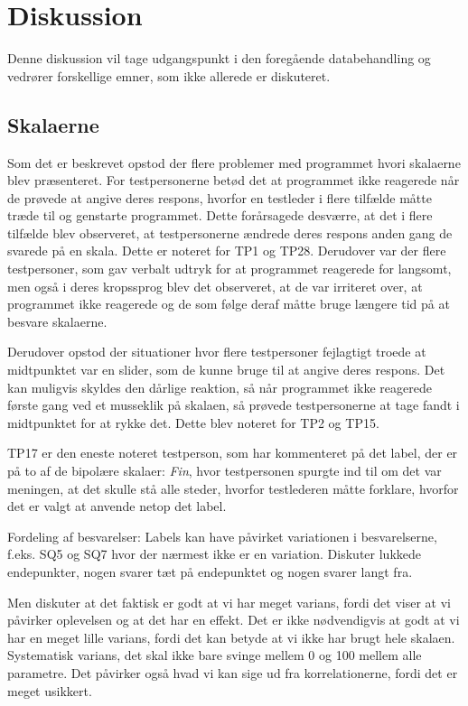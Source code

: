 \chapter{Diskussion}
\label{TestAfSkalaDiskussion}
%
Denne diskussion vil tage udgangspunkt i den foregående databehandling og vedrører forskellige emner, som ikke allerede er diskuteret.  

\section{Skalaerne}
\label{DiskussionSkala}
%
Som det er beskrevet  opstod der flere problemer med programmet hvori skalaerne blev præsenteret. For testpersonerne betød det at programmet ikke reagerede når de prøvede at angive deres respons, hvorfor en testleder i flere tilfælde måtte træde til og genstarte programmet. Dette forårsagede desværre, at det i flere tilfælde blev observeret, at testpersonerne ændrede deres respons anden gang de svarede på en skala. Dette er noteret for TP1 og TP28. Derudover var der flere testpersoner, som gav verbalt udtryk for at programmet reagerede for langsomt, men også i deres kropssprog blev det observeret, at de var irriteret over, at programmet ikke reagerede og de som følge deraf måtte bruge længere tid på at besvare skalaerne. 

Derudover opstod der situationer hvor flere testpersoner fejlagtigt troede at midtpunktet var en slider, som de kunne bruge til at angive deres respons. Det kan muligvis skyldes den dårlige reaktion, så når programmet ikke reagerede første gang ved et musseklik på skalaen, så prøvede testpersonerne at tage fandt i midtpunktet for at rykke det. Dette blev noteret for TP2 og TP15. 

TP17 er den eneste noteret testperson, som har kommenteret på det label, der er på to af de bipolære skalaer: \textit{Fin}, hvor testpersonen spurgte ind til om det var meningen, at det skulle stå alle steder, hvorfor testlederen måtte forklare, hvorfor det er valgt at anvende netop det label.\blankline
% 
  





Fordeling af besvarelser: Labels kan have påvirket variationen i besvarelserne, f.eks. SQ5 og SQ7 hvor der nærmest ikke er en variation. Diskuter lukkede endepunkter, nogen svarer tæt på endepunktet og nogen svarer langt fra. 

Men diskuter at det faktisk er godt at vi har meget varians, fordi det viser at vi påvirker oplevelsen og at det har en effekt. Det er ikke nødvendigvis at godt at vi har en meget lille varians, fordi det kan betyde at vi ikke har brugt hele skalaen. Systematisk varians, det skal ikke bare svinge mellem 0 og 100 mellem alle parametre. Det påvirker også hvad vi kan sige ud fra korrelationerne, fordi det er meget usikkert. 

